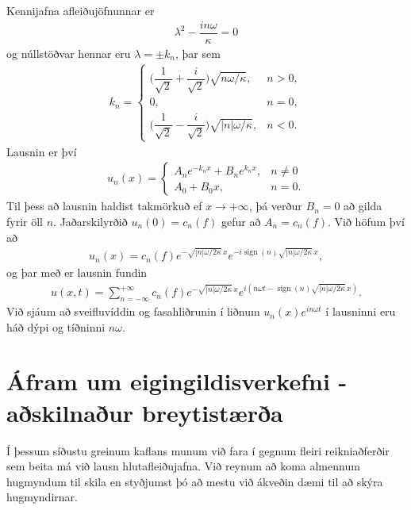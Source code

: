 \documentclass[a4paper,10pt,icelandic]{sphinxmanual}
\begin{document}
Kennijafna afleiðujöfnunnar er
\begin{equation*}
\begin{split}\lambda^2-\dfrac{in\omega}\kappa=0\end{split}
\end{equation*}
og núllstöðvar hennar eru \(\lambda=\pm k_n\), þar sem
\begin{equation*}
\begin{split}k_n=
 \begin{cases}
 \bigg(\dfrac 1{\sqrt 2}+\dfrac i{\sqrt 2}\bigg)
 \sqrt{n\omega/\kappa}, &n>0,\\
 0, &n=0,\\
 \bigg(\dfrac 1{\sqrt 2}-\dfrac i{\sqrt 2}\bigg)
 \sqrt{|n|\omega/\kappa}, &n<0.
 \end{cases}\end{split}
\end{equation*}
Lausnin er því
\begin{equation*}
\begin{split}u_n(x)=\begin{cases}
 A_ne^{-k_nx}+B_ne^{k_nx}, &n\neq 0\\
 A_0+B_0x, &n=0.
 \end{cases}\end{split}
\end{equation*}
Til þess að lausnin haldist takmörkuð ef \(x\to +\infty\), þá
verður \(B_n=0\) að gilda fyrir öll \(n\). Jaðarskilyrðið
\(u_n(0)=c_n(f)\) gefur að \(A_n=c_n(f)\). Við höfum því að
\begin{equation*}
\begin{split}u_n(x)=c_n(f)e^{-\sqrt{|n|\omega/2\kappa}\, x}
 e^{-i{{\operatorname{sign}}}(n)\sqrt{|n|\omega/2\kappa}\, x},\end{split}
\end{equation*}
og þar með er lausnin fundin
\begin{equation*}
\begin{split}u(x,t)=\sum\limits_{n=-\infty}^{+\infty}
 c_n(f)e^{-\sqrt{|n|\omega/2\kappa}\, x}
 e^{i(n\omega t-{{\operatorname{sign}}}(n)\sqrt{|n|\omega/2\kappa}\, x)}.\end{split}
\end{equation*}
Við sjáum að sveifluvíddin og fasahliðrunin í liðnum
\(u_n(x)e^{in\omega t}\) í lausninni eru háð dýpi og tíðninni
\(n\omega\).


\section{Áfram um eigingildisverkefni - aðskilnaður breytistærða}
\label{\detokenize{Kafli03:afram-um-eigingildisverkefni-askilnaur-breytistaera}}
Í þessum síðustu greinum kaflans munum við fara í gegnum fleiri reikniaðferðir sem beita má við lausn hlutafleiðujafna. Við reynum að koma almennum hugmyndum til skila en styðjumst þó að mestu við ákveðin dæmi til að skýra hugmyndirnar.
\end{document}
